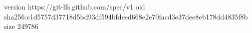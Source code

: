 version https://git-lfs.github.com/spec/v1
oid sha256:c1d5757d37718d5bd93df594bfdeed668e2e70facd3e37dee8eb178dd4835f8b
size 249786
